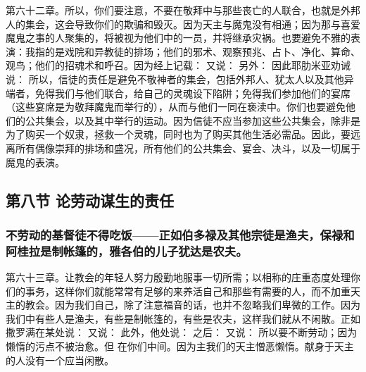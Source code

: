 第六十二章。所以，你们要注意，不要在敬拜中与那些丧亡的人联合，也就是外邦人的集会，这会导致你们的欺骗和毁灭。因为天主与魔鬼没有相通；因为那与喜爱魔鬼之事的人聚集的，将被视为他们中的一员，并将继承灾祸。也要避免不雅的表演：我指的是戏院和异教徒的排场；他们的邪术、观察预兆、占卜、净化、算命、观鸟；他们的招魂术和呼召。因为经上记载：  又说： 另外：  因此耶肋米亚劝诫说： 所以，信徒的责任是避免不敬神者的集会，包括外邦人、犹太人以及其他异端者，免得我们与他们联合，给自己的灵魂设下陷阱；免得我们参加他们的宴席（这些宴席是为敬拜魔鬼而举行的），从而与他们一同在亵渎中。你们也要避免他们的公共集会，以及其中举行的运动。因为信徒不应当参加这些公共集会，除非是为了购买一个奴隶，拯救一个灵魂，同时也为了购买其他生活必需品。因此，要远离所有偶像崇拜的排场和盛况，所有他们的公共集会、宴会、决斗，以及一切属于魔鬼的表演。\par


\subsection{第八节 论劳动谋生的责任}


\subsubsection{不劳动的基督徒不得吃饭——正如伯多禄及其他宗徒是渔夫，保禄和阿桂拉是制帐篷的，雅各伯的儿子犹达是农夫。}

第六十三章。让教会的年轻人努力殷勤地服事一切所需；以相称的庄重态度处理你们的事务，这样你们就能常常有足够的来养活自己和那些有需要的人，而不加重天主的教会。因为我们自己，除了注意福音的话，也并不忽略我们卑微的工作。因为我们中有些人是渔夫，有些是制帐篷的，有些是农夫，这样我们就从不闲散。正如撒罗满在某处说： 又说：  此外，他处说：  之后：  又说：  所以要不断劳动；因为懒惰的污点不被治愈。但  在你们中间。因为主我们的天主憎恶懒惰。献身于天主的人没有一个应当闲散。\par

